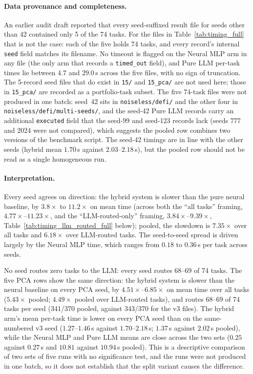 \documentclass[twoside,11pt]{article}
\begin{document}
\paragraph{Data provenance and completeness.}
\label{sec:timing_data_defect}
An earlier audit draft reported that every seed-suffixed result file for
seeds other than 42 contained only 5 of the 74 tasks. For the files in
Table~\ref{tab:timing_full} that is not the case: each of the five holds
74 tasks, and every record's internal \texttt{seed} field matches its filename. No timeout is flagged on the
Neural MLP arm in any file (the only arm that records a \texttt{timed\_out} field), and Pure LLM per-task
times lie between $4.7$ and $29.0$\,s across the five files, with no sign of truncation. The 5-record seed files that
do exist in \texttt{15/} and \texttt{15\_pca/} are not used here; those in
\texttt{15\_pca/} are recorded as a portfolio-task subset. The five 74-task files were not
produced in one batch: seed~42 sits in \texttt{noiseless/defi/} and the other
four in \texttt{noiseless/defi/multi-seeds/}, and the seed-42 Pure LLM records
carry an additional \texttt{executed} field that the seed-99 and seed-123 records lack
(seeds 777 and 2024 were not compared), which suggests the
pooled row combines two versions of the benchmark script. The seed-42 timings are in
line with the other seeds (hybrid mean $1.70$\,s against $2.03$--$2.18$\,s),
but the pooled row should not be read as a single homogeneous run.

\paragraph{Interpretation.}
Every seed agrees on direction: the hybrid system is
slower than the pure neural baseline, by $3.8\times$ to $11.2\times$ on
mean time (across both the ``all tasks'' framing, $4.77\times$--$11.23\times$,
and the ``LLM-routed-only'' framing, $3.84\times$--$9.39\times$,
Table~\ref{tab:timing_llm_routed_full} below); pooled, the slowdown is
$7.35\times$ over all tasks and $6.18\times$ over LLM-routed tasks. The seed-to-seed spread is driven
largely by the Neural MLP time, which ranges from $0.18$ to $0.36$\,s per task
across seeds. 

No seed routes zero tasks to the LLM: every seed routes 68--69 of 74 tasks.
The five PCA rows show the same direction: the hybrid system is slower than the neural
baseline on every PCA seed, by $4.51\times$--$6.85\times$ on mean time over all tasks
($5.43\times$ pooled; $4.49\times$ pooled over LLM-routed tasks), and routes 68--69 of 74
tasks per seed (341/370 pooled, against 343/370 for the v3 files). The hybrid arm's mean
per-task time is lower on every PCA seed than on the same-numbered v3 seed ($1.27$--$1.46$\,s
against $1.70$--$2.18$\,s; $1.37$\,s against $2.02$\,s pooled), while the Neural MLP and
Pure LLM means are close across the two sets ($0.25$ against $0.27$\,s and $10.81$ against
$10.94$\,s pooled). This is a descriptive comparison of two sets of five runs with no
significance test, and the runs were not produced in one batch, so it does not establish
that the split variant causes the difference.
\end{document}
